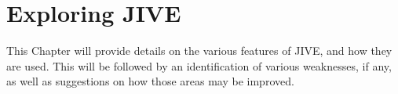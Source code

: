 \chapter{Exploring JIVE}\label{jiveEnhance}

This Chapter will provide details on the various features of JIVE,  and how they are used.
This will be followed by an identification of various weaknesses, if any, as well as suggestions on how those areas may be improved.







